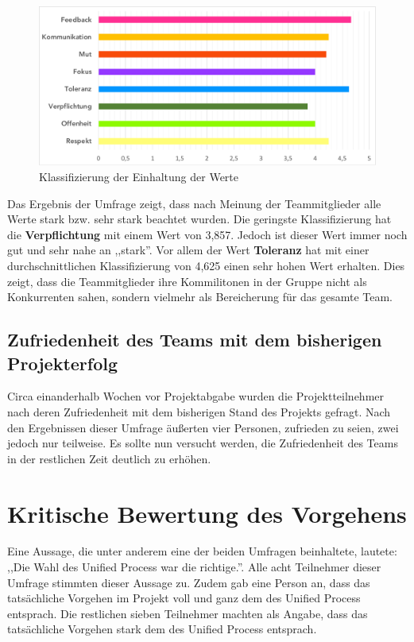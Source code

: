 \documentclass[../review_3.tex]{subfiles}
\begin{document}
\begin{figure} [t]
    \centering
    \includegraphics[width = \linewidth]{img/werteErg.pdf}
    \caption{Klassifizierung der Einhaltung der Werte}
    \label{werte2}
\end{figure}

Das Ergebnis der Umfrage zeigt, dass nach Meinung der Teammitglieder alle Werte stark bzw. sehr stark beachtet wurden. Die geringste Klassifizierung hat die \textbf{Verpflichtung} mit einem Wert von 3,857. Jedoch ist dieser Wert immer noch gut und sehr nahe an ,,stark''. Vor allem der Wert \textbf{Toleranz} hat mit einer durchschnittlichen Klassifizierung von 4,625 einen sehr hohen Wert erhalten. Dies zeigt, dass die Teammitglieder ihre Kommilitonen in der Gruppe nicht als Konkurrenten sahen, sondern vielmehr als Bereicherung für das gesamte Team.

\subsection{Zufriedenheit des Teams mit dem bisherigen Projekterfolg}
Circa einanderhalb Wochen vor Projektabgabe wurden die Projektteilnehmer nach deren Zufriedenheit mit dem bisherigen Stand des Projekts gefragt.
Nach den Ergebnissen dieser Umfrage äußerten vier Personen, zufrieden zu seien, zwei jedoch nur teilweise.
Es sollte nun versucht werden, die Zufriedenheit des Teams in der restlichen Zeit deutlich zu erhöhen.

\newpage

\section{Kritische Bewertung des Vorgehens}
Eine Aussage, die unter anderem eine der beiden Umfragen beinhaltete, lautete: ,,Die Wahl des Unified Process war die richtige.''. Alle acht Teilnehmer dieser Umfrage stimmten dieser Aussage zu. Zudem gab eine Person an, dass das tatsächliche Vorgehen im Projekt voll und ganz dem des Unified Process entsprach. Die restlichen sieben Teilnehmer machten als Angabe, dass das tatsächliche Vorgehen stark dem des Unified Process entsprach.
\end{document}
